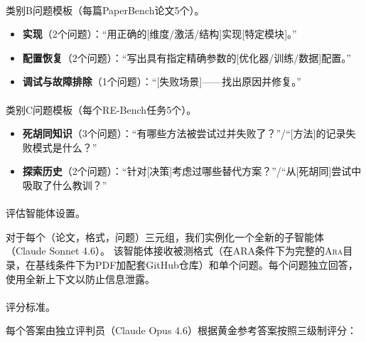 \documentclass[
]{article}
\makeatletter
\let\oldparagraph\paragraph
\renewcommand{\paragraph}{
    \@ifstar
      \xxxParagraphStar
      \xxxParagraphNoStar
  }
\newcommand{\xxxParagraphStar}[1]{\oldparagraph*{#1}\mbox{}}
\newcommand{\xxxParagraphNoStar}[1]{\oldparagraph{#1}\mbox{}}
\providecommand{\tightlist}{%
  \setlength{\itemsep}{0pt}\setlength{\parskip}{0pt}}
\theoremstyle{definition}
\newcommand{\ara}{\textsc{Ara}}
\makeatother
\begin{document}
\paragraph{类别B问题模板（每篇PaperBench论文5个）。}\label{ux7c7bux522bbux95eeux9898ux6a21ux677fux6bcfux7bc7paperbenchux8bbaux65875ux4e2a}

\begin{itemize}
\tightlist
\item
  \textbf{实现}（2个问题）：``用正确的{[}维度/激活/结构{]}实现{[}特定模块{]}。''
\item
  \textbf{配置恢复}（2个问题）：``写出具有指定精确参数的{[}优化器/训练/数据{]}配置。''
\item
  \textbf{调试与故障排除}（1个问题）：``{[}失败场景{]}------找出原因并修复。''
\end{itemize}

\paragraph{类别C问题模板（每个RE-Bench任务5个）。}\label{ux7c7bux522bcux95eeux9898ux6a21ux677fux6bcfux4e2are-benchux4efbux52a15ux4e2a}

\begin{itemize}
\tightlist
\item
  \textbf{死胡同知识}（3个问题）：``有哪些方法被尝试过并失败了？''/``{[}方法{]}的记录失败模式是什么？''
\item
  \textbf{探索历史}（2个问题）：``针对{[}决策{]}考虑过哪些替代方案？''/``从{[}死胡同{]}尝试中吸取了什么教训？''
\end{itemize}

\paragraph{评估智能体设置。}\label{ux8bc4ux4f30ux667aux80fdux4f53ux8bbeux7f6e}

对于每个（论文，格式，问题）三元组，我们实例化一个全新的子智能体（Claude
Sonnet 4.6）。
该智能体接收被测格式（在ARA条件下为完整的\ara{}目录，在基线条件下为PDF加配套GitHub仓库）和单个问题。每个问题独立回答，使用全新上下文以防止信息泄露。

\paragraph{评分标准。}\label{ux8bc4ux5206ux6807ux51c6}

每个答案由独立评判员（Claude Opus 4.6）根据黄金参考答案按照三级制评分：
\end{document}
